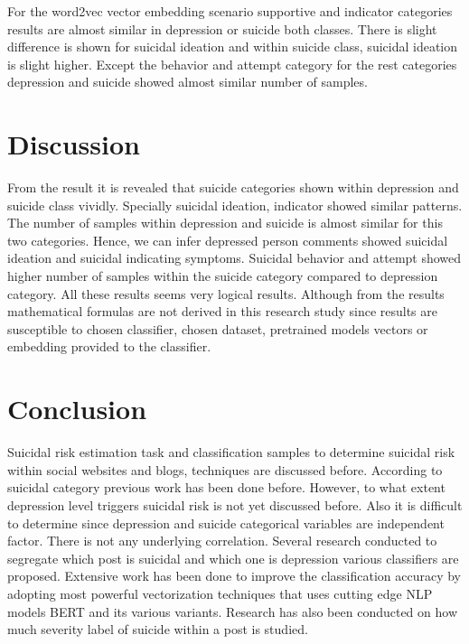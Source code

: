 \documentclass[sn-mathphys,Numbered]{sn-jnl}%
\theoremstyle{thmstyleone}%
\theoremstyle{thmstyletwo}%
\theoremstyle{thmstylethree}%
\begin{document}
For the word2vec vector embedding scenario supportive and indicator categories results are almost similar in depression or suicide both classes. There is slight difference is shown for suicidal ideation and within suicide class, suicidal ideation is slight higher. Except the behavior and attempt category for the rest categories depression and suicide showed almost similar number of samples. 

%        
\section{Discussion} 
From the result it is revealed that suicide categories shown within depression and suicide class vividly. Specially suicidal ideation, indicator showed similar patterns. The number of samples within depression and suicide is almost similar for this two categories. Hence, we can infer depressed person comments showed suicidal ideation and suicidal indicating symptoms. Suicidal behavior and attempt showed higher number of samples within the suicide category compared to depression category. All these results seems very logical results. Although from the results mathematical formulas are not derived in this research study since results are susceptible to chosen classifier, chosen dataset, pretrained models vectors or embedding provided to the classifier. 
 
\section{Conclusion}
Suicidal risk estimation task and classification samples to determine suicidal risk within social websites and blogs, techniques are discussed before. According to suicidal category previous work has been done before. However, to what extent depression level triggers suicidal risk is not yet discussed before. Also it is difficult to determine since depression and suicide categorical variables are independent factor. There is not any underlying correlation. Several research conducted to segregate which post is suicidal and which one is depression various classifiers are proposed. Extensive work has been done to improve the classification accuracy by adopting most powerful vectorization techniques that uses cutting edge NLP models BERT and its various variants. Research has also been conducted on how much severity label of suicide within a post is studied. 
\end{document}
